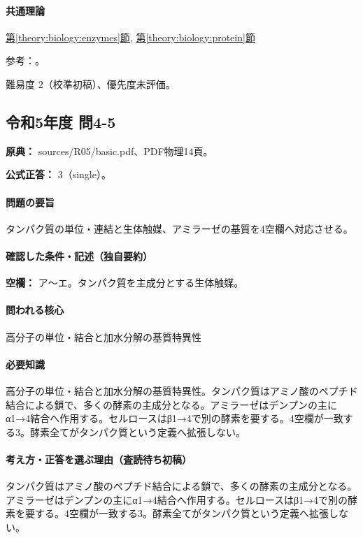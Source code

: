 \paragraph{共通理論} \hyperref[theory:biology:enzymes]{第\ref*{theory:biology:enzymes}節}, \hyperref[theory:biology:protein]{第\ref*{theory:biology:protein}節}

\par 参考：\cite{iubmb_lipase,hyper_amylase}。

\par 難易度 2（校準初稿）、優先度未評価。

\subsection{令和5年度 問4-5}
\label{q:r05-reg-basic-4-5}

\noindent\textbf{原典：} sources/R05/basic.pdf、PDF物理14頁。

\textbf{公式正答：} 3（single）。

\paragraph{問題の要旨} タンパク質の単位・連結と生体触媒、アミラーゼの基質を4空欄へ対応させる。

\paragraph{確認した条件・記述（独自要約）}\mbox{}\par

\noindent\textbf{空欄：} ア〜エ。タンパク質を主成分とする生体触媒。\par

\paragraph{問われる核心} 高分子の単位・結合と加水分解の基質特異性

\paragraph{必要知識} 高分子の単位・結合と加水分解の基質特異性。タンパク質はアミノ酸のペプチド結合による鎖で、多くの酵素の主成分となる。アミラーゼはデンプンの主にα1→4結合へ作用する。セルロースはβ1→4で別の酵素を要する。4空欄が一致する3。酵素全てがタンパク質という定義へ拡張しない。

\paragraph{考え方・正答を選ぶ理由（査読待ち初稿）} タンパク質はアミノ酸のペプチド結合による鎖で、多くの酵素の主成分となる。アミラーゼはデンプンの主にα1→4結合へ作用する。セルロースはβ1→4で別の酵素を要する。4空欄が一致する3。酵素全てがタンパク質という定義へ拡張しない。


